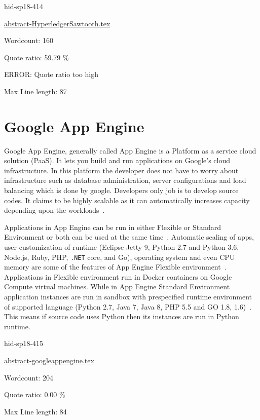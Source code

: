 \begin{IU}

hid-sp18-414

\href{https://github.com/cloudmesh-community/hid-sp18-414/blob/master//technology/abstract-HyperledgerSawtooth.tex}{abstract-HyperledgerSawtooth.tex}

 

Wordcount: 160


Quote ratio: 59.79 \%

ERROR: Quote ratio too high
 
Max Line length: 87
\end{IU}

\section{Google App Engine}

Google App Engine, generally called App Engine is a Platform as a service cloud 
solution (PaaS). It lets you build and run applications on Google’s cloud 
infrastructure. In this platform the developer does not have to worry about 
infrastructure such as database administration, server configurations and 
load balancing which is done by google. Developers only job is to develop 
source codes.  It claims to be highly scalable as it can automatically 
increases capacity depending upon the
workloads~\cite{hid-sp18-415-www-scalabitity}.
 
Applications in App Engine can be run in either Flexible or Standard Environment or 
both can be used at the same time~\cite{hid-sp18-415-www-cloud-goggle}. 
Automatic scaling of apps, user customization of runtime (Eclipse Jetty 9, 
Python 2.7 and Python 3.6, Node.js, Ruby, PHP, \verb|.NET| core, and Go), operating 
system and even CPU memory  are some of the features of App Engine Flexible 
environment~\cite{hid-sp18-415-www-cloud-goggle}. Applications in Flexible 
environment run in Docker containers on Google Compute virtual machines. While 
in App Engine Standard Environment application instances are run in sandbox with 
prespecified runtime environment of supported language (Python 2.7, Java 7, 
Java 8, PHP 5.5 and GO 1.8,  1.6)~\cite{hid-sp18-415-app-engine}. 
This means if source code uses Python then its instances are run in Python runtime. 


\begin{IU}

hid-sp18-415

\href{https://github.com/cloudmesh-community/hid-sp18-415/blob/master//technology/abstract-googleappengine.tex}{abstract-googleappengine.tex}

 

Wordcount: 204


Quote ratio: 0.00 \%
 
Max Line length: 84
\end{IU}

